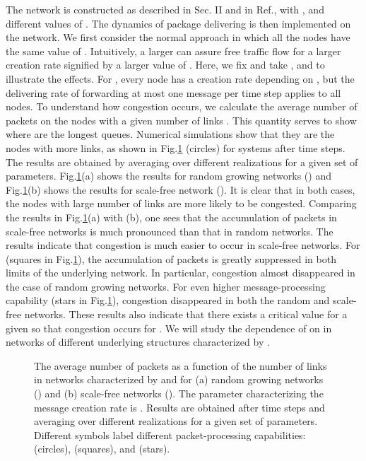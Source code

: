 \documentclass[aps,prl,twocolumn,superscriptaddress,showpacs]{revtex4}
\begin{document}
The network is constructed as described in Sec. II and in
Ref.\cite{LLYD:2002}, with ,  and different values of
.  The dynamics of package delivering is then implemented on
the network. We first consider the normal approach in which all
the nodes have the same value of . Intuitively, a larger
 can assure free traffic flow for a larger creation rate
signified by a larger value of . Here, we fix
 and take , and  to illustrate
the effects.  For , every node has a creation rate
 depending on , but the delivering rate of
forwarding at most one message per time step applies to all nodes.
To understand how congestion occurs, we calculate the average
number of packets  on the nodes with a given
number of links .  This quantity serves to show where are the
longest queues. Numerical simulations show that they are the nodes
with more links, as shown in Fig.\ref{fig1} (circles) for systems
after  time steps. The results are obtained by averaging
over  different realizations for a given set of parameters.
Fig.\ref{fig1}(a) shows the results for random growing networks
() and Fig.\ref{fig1}(b) shows the results for scale-free
network (). It is clear that in both cases, the nodes with
large number of links are more likely to be congested. Comparing
the results in Fig.\ref{fig1}(a) with (b), one sees that the
accumulation of packets in scale-free networks is much pronounced
than that in random networks.  The results indicate that
congestion is much easier to occur in scale-free networks. For
 (squares in Fig.\ref{fig1}), the accumulation of
packets is greatly suppressed in both limits of the underlying
network.  In particular, congestion almost disappeared in the case
of random growing networks. For even higher message-processing
capability  (stars in Fig.\ref{fig1}), congestion
disappeared in both the random and scale-free networks.  These
results also indicate that there exists a critical value
 for a given  so that congestion occurs for
. We will study the dependence of 
on  in networks of different underlying structures
characterized by .

\begin{figure}
\begin{center}
 \caption{The
average number of packets  as a function of
the number of links  in networks characterized by  and
 for (a) random growing networks () and (b)
scale-free networks (). The parameter characterizing the
message creation rate is .  Results are obtained
after  time steps and averaging over  different
realizations for a given set of parameters.  Different symbols
label different packet-processing capabilities: 
(circles),  (squares), and  (stars).}
\label{fig1}
\end{center}
\end{figure}
\end{document}
